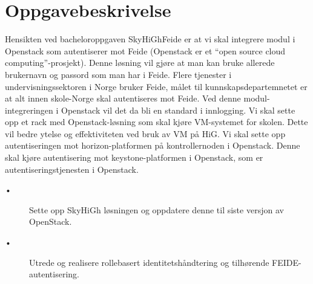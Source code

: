 \section{Oppgavebeskrivelse}
Hensikten ved bacheloroppgaven SkyHiGhFeide er at vi skal integrere modul i Openstack som autentiserer mot Feide (Openstack er et “open source cloud computing”-prosjekt). Denne løsning vil gjøre at man kan bruke allerede brukernavn og passord som man har i Feide. Flere tjenester i undervisningssektoren i Norge bruker Feide, målet til kunnskapsdepartemnetet er at alt innen skole-Norge skal autentiseres mot Feide. Ved denne modul-integreringen i Openstack vil det da bli en standard i innlogging. \newline \newline
Vi skal sette opp et rack med Openstack-løsning som skal kjøre VM-systemet for skolen. Dette vil bedre ytelse og effektiviteten ved bruk av VM på HiG. Vi skal sette opp autentiseringen mot horizon-platformen på kontrollernoden i Openstack. Denne skal kjøre autentisering mot keystone-platformen i Openstack, som er autentiseringstjenesten i Openstack. 
\begin{description}
\item[\tab •] Sette opp SkyHiGh løsningen og oppdatere denne til siste versjon av OpenStack.
\item[\tab •] Utrede og realisere rollebasert identitetshåndtering og tilhørende FEIDE-autentisering.
\end{description}
